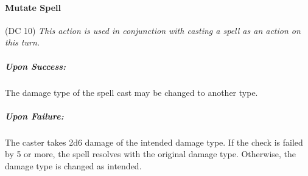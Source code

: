 \documentclass{article}
\newcommand{\action}[2]{\paragraph*{{\color{tan}#1}} (DC #2)\newline}
\newcommand{\success}{\subparagraph*{{\color{tan}Upon Success:}}}
\newcommand{\failure}{\subparagraph*{{\color{tan}Upon Failure:}}}
\newcommand{\attuned}{ {\em \color{req} This action is used in conjunction with casting a spell as an action on this turn.} }
\begin{document}
\begin{multicols}{2}
\action{Mutate Spell}{10}
  \attuned
\success
  The damage type of the spell cast may be changed to another type.
\failure
  The caster takes 2d6 damage of the intended damage type.
  If the check is failed by 5 or more, the spell resolves with the original damage type.
  Otherwise, the damage type is changed as intended.

\end{multicols}
\end{document}
